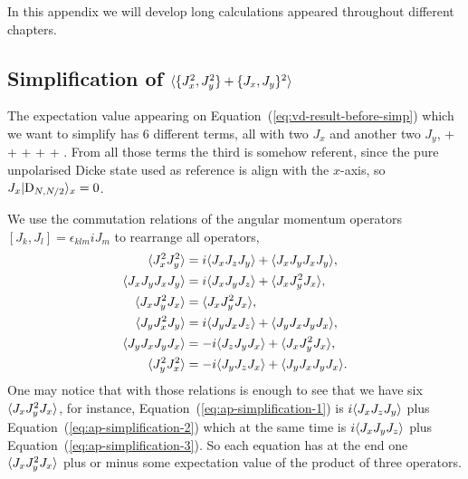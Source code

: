 In this appendix we will develop long calculations appeared throughout different chapters.

\subsection[Simplification of the Eq.~{(\ref{eq:vd-result-before-simp})}]
{Simplification of $\langle \{J_x^2,J_y^2\}+\{J_x,J_y\}^2 \rangle$}
\label{ap:loca-simplification}

The expectation value appearing on Equation~{(\ref{eq:vd-result-before-simp})} which we want to simplify has 6 different terms, all with two $J_x$ and another two $J_y$,
\be
   +  + 
  +  +  + .
\ee
From all those terms the third is somehow referent, since the pure unpolarised Dicke state used as reference is align with the $x$-axis, so $J_x\vert \textnormal{D}_{N,N/2} \rangle_x=0$.

We use the commutation relations of the angular momentum operators $[J_k,J_l]=\epsilon_{klm} iJ_m$ to rearrange all operators,
\begin{subequations}
\begin{align}
  \langle J_x^2J_y^2 \rangle & = i\langle J_xJ_zJ_y \rangle+\langle J_xJ_yJ_xJ_y \rangle,
  \label{eq:ap-simplification-1} \\
  \langle J_xJ_yJ_xJ_y \rangle & = i\langle J_xJ_yJ_z \rangle+\langle J_xJ_y^2J_x \rangle,
  \label{eq:ap-simplification-2} \\
  \langle J_xJ_y^2J_x \rangle & = \langle J_xJ_y^2J_x \rangle,
  \label{eq:ap-simplification-3} \\
  \langle J_yJ_x^2J_y \rangle & = i\langle J_yJ_xJ_z \rangle + \langle J_yJ_xJ_yJ_x \rangle,
  \label{eq:ap-simplification-4} \\
  \langle J_yJ_xJ_yJ_x \rangle & = -i\langle J_zJ_yJ_x \rangle + \langle J_xJ_y^2J_x \rangle,
  \label{eq:ap-simplification-5} \\
  \langle J_y^2J_x^2 \rangle & = -i\langle J_yJ_zJ_x \rangle + \langle J_yJ_xJ_yJ_x \rangle.
  \label{eq:ap-simplification-6}
\end{align}
\end{subequations}
One may notice that with those relations is enough to see that we have six $\langle J_xJ_y^2J_x \rangle$, for instance, Equation~{(\ref{eq:ap-simplification-1})} is $i\langle J_xJ_zJ_y \rangle$ plus Equation~{(\ref{eq:ap-simplification-2})} which at the same time is $i\langle J_xJ_yJ_z \rangle$ plus Equation~{(\ref{eq:ap-simplification-3})}.
So each equation has at the end one $\langle J_xJ_y^2J_x \rangle$ plus or minus some expectation value of the product of three operators.


